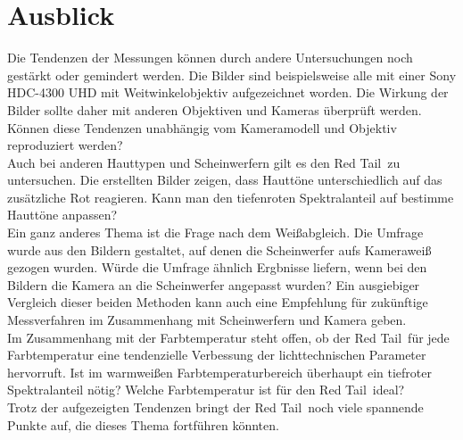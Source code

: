 \chapter{Ausblick}
Die Tendenzen der Messungen können durch andere Untersuchungen noch gestärkt oder gemindert werden.
Die Bilder sind beispielsweise alle mit einer Sony HDC-4300 UHD mit Weitwinkelobjektiv aufgezeichnet worden. Die Wirkung der Bilder sollte daher mit anderen Objektiven und Kameras überprüft werden. Können diese Tendenzen unabhängig vom Kameramodell und Objektiv reproduziert werden?\\
Auch bei anderen Hauttypen und Scheinwerfern gilt es den \glqq Red Tail\grqq\ zu untersuchen. Die erstellten Bilder zeigen, dass Hauttöne unterschiedlich auf das zusätzliche Rot reagieren. Kann man den tiefenroten Spektralanteil auf bestimme Hauttöne anpassen? \\
Ein ganz anderes Thema ist die Frage nach dem Weißabgleich. Die Umfrage wurde aus den Bildern gestaltet, auf denen die Scheinwerfer aufs Kameraweiß gezogen wurden. Würde die Umfrage ähnlich Ergbnisse liefern, wenn bei den Bildern die Kamera an die Scheinwerfer angepasst wurden? Ein ausgiebiger Vergleich dieser beiden Methoden kann auch eine Empfehlung für zukünftige Messverfahren im Zusammenhang mit Scheinwerfern und Kamera geben.\\
Im Zusammenhang mit der Farbtemperatur steht offen, ob der \glqq Red Tail\grqq\ für jede Farbtemperatur eine tendenzielle Verbessung der lichttechnischen Parameter hervorruft. Ist im warmweißen Farbtemperaturbereich überhaupt ein tiefroter Spektralanteil nötig? Welche Farbtemperatur ist für den \glqq Red Tail\grqq\ ideal?\\
Trotz der aufgezeigten Tendenzen bringt der \glqq Red Tail\grqq\ noch viele spannende Punkte auf, die dieses Thema fortführen könnten.   



\listoffigures %
\listoftables %


